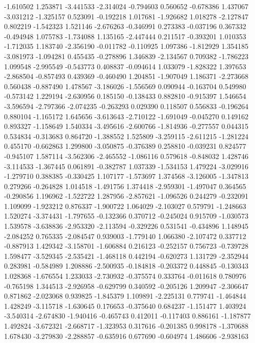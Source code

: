 -1.610502
1.253871
-3.441533
-2.314024
-0.794603
0.560652
-0.678386
1.437067
-3.031212
-1.325157
0.523091
-0.192218
1.017681
-1.926682
1.018278
-2.127847
0.802219
-1.542323
1.521146
-2.676263
-0.346991
0.273383
-0.037196
0.367332
-0.494948
1.075783
-1.734088
1.135165
-2.447444
0.211517
-0.393201
1.010353
-1.712035
1.183740
-2.356190
-0.011782
-0.110925
1.097386
-1.812929
1.354185
-3.081973
-1.094281
0.455435
-0.278896
1.346839
-2.134567
0.709382
-1.786223
1.099548
-2.995549
-0.543773
0.408837
-0.094614
1.033079
-1.828322
1.397653
-2.868504
-0.857493
0.439369
-0.460490
1.204851
-1.907049
1.186371
-2.273668
0.560438
-0.887490
1.478567
-3.186026
-1.556569
0.090944
-0.163704
0.549980
-0.573142
1.229194
-2.630956
0.185150
-0.138433
0.882810
-0.915397
1.546654
-3.596594
-2.797366
-2.074235
-0.263293
0.029390
0.118507
0.556833
-0.196264
0.880104
-1.165172
1.645656
-3.613643
-2.710122
-1.691049
-0.045270
0.149162
0.893327
-1.158649
1.540334
-3.495616
-2.600766
-1.814936
-0.277557
0.044315
0.534834
-0.313683
0.864720
-1.388552
1.525809
-3.259115
-2.611215
-1.281224
0.455170
-0.662863
1.299800
-3.050875
-0.376389
0.258810
-0.039231
0.824577
-0.945107
1.587114
-3.562306
-2.465552
-1.086116
0.579618
-0.848032
1.428746
-3.114533
-1.367445
0.061891
-0.382787
1.037339
-1.534153
1.479224
-3.029916
-1.279710
0.388385
-0.330425
1.107177
-1.573697
1.374568
-3.126005
-1.347813
0.279266
-0.264828
1.014518
-1.491756
1.374418
-2.959301
-1.497047
0.364565
-0.290856
1.196962
-1.522722
1.287956
-2.857621
-1.096526
0.244279
-0.232091
1.109099
-1.923212
0.876337
-1.900722
1.064029
-2.103027
0.579791
-1.248663
1.520274
-3.374431
-1.797655
-0.132366
0.370712
-0.245024
0.915709
-1.030573
1.539578
-3.638836
-2.953320
-2.113594
-0.329226
0.531541
-0.434896
1.148945
-2.084252
0.765335
-2.084547
0.939003
-1.779140
1.066380
-2.107472
0.337712
-0.887913
1.429342
-3.158701
-1.606884
0.216123
-0.252157
0.756723
-0.739728
1.598477
-3.529345
-2.535421
-1.468118
0.442194
-0.620273
1.131729
-2.352944
0.283981
-0.584989
1.208886
-2.500935
-0.184818
-0.203372
0.448845
-0.130343
1.028368
-1.676554
1.233033
-2.730932
-0.375574
0.333764
-0.011618
0.780976
-0.765198
1.344513
-2.926958
-0.629799
0.340592
-0.205126
1.209947
-2.306647
0.871862
-2.023068
0.939825
-1.845379
1.109891
-2.225131
0.779741
-1.464844
1.428249
-3.115718
-1.630645
0.176653
-0.375640
0.684237
-1.151477
1.403924
-3.540314
-2.674830
-1.940416
-0.465743
0.412011
-0.117403
0.886161
-1.187877
1.492824
-3.672321
-2.668717
-1.323953
0.317616
-0.201385
0.998178
-1.370688
1.678430
-3.279830
-2.288857
-0.635916
0.677690
-0.604974
1.486606
-2.938163
